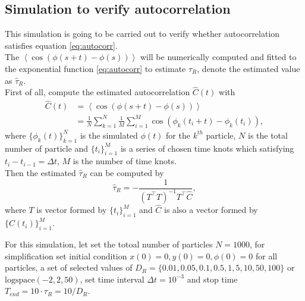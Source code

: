 \documentclass[runningheads]{llncs}
\begin{document}


\subsection{Simulation to verify autocorrelation}

This simulation is going to be carried out to verify whether autocorrelation satisfies equation \eqref{eq:autocorr}. \\
The $\left\langle\cos(\phi(s+t)-\phi(s))\right\rangle$ will be numerically computed and 
fitted to the exponential function \eqref{eq:autocorr} to estimate $\tau_R$, denote the estimated value as $\hat{\tau}_R$.\\
First of all, compute the estimated autocorrelation $\hat{C}(t)$ with
\begin{equation}
\begin{aligned}
\hat{C}(t)
&=\left\langle\cos(\phi(s+t)-\phi(s))\right\rangle\\
&=\frac1N\sum_{k=1}^N\frac1M\sum_{i=1}^M\cos(\phi_k(t_i+t)-\phi_k(t_i)),
\end{aligned}
\end{equation}
where $\{\phi_k(t)\}_{k=1}^N$ is the simulated $\phi(t)$ for the $k^{th}$ particle, $N$ is the total number of particle
and $\{t_i\}_{i=1}^M$ is a series of chosen time knots which satisfying $t_i-t_{i-1}=\Delta t$, $M$ is the number of time knots.\\
Then the estimated $\hat{\tau}_R$ can be computed by
\begin{equation}
\hat{\tau}_R=-\frac1{\left({T^\top T}\right)^{-1}T^\top \hat{C}},
\end{equation}
where $T$ is vector formed by $\{t_i\}_{i=1}^M$ 
and $\hat{C}$ is also a vector formed by $\{\hat{C}(t_i)\}_{i=1}^M$.

\noindent For this simulation, let set the totoal number of particles $N=1000$, 
for simplification set initial condition $x(0)=0,y(0)=0,\phi(0)=0$ for all particles,
a set of selected values of $D_R=\{0.01,0.05,0.1,0.5,1,5,10,50,100\}$ or $\text{logspace}(-2,2,50)$,
set time interval $\Delta t=10^{-3}$ and stop time $T_{end}=10\cdot\tau_R=10/D_R$.
\end{document}

